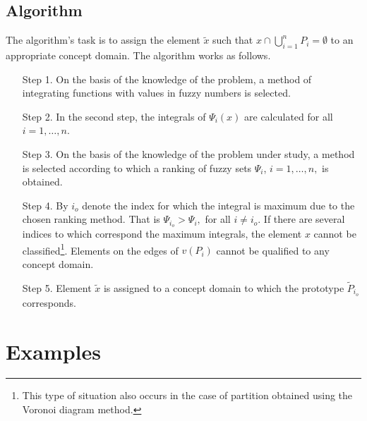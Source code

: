\documentclass[leqno,12pt]{amsart}
\theoremstyle{remark}
\theoremstyle{remark}
\theoremstyle{remark}
\theoremstyle{definition}
\numberwithin{equation}{section}
\begin{document}
\subsection{Algorithm} The algorithm's task is to assign the element $\tilde x$ such that $x\cap\bigcup_{i=1}^nP_i=\emptyset$ to an appropriate concept domain. The algorithm works as follows.
\begin{itemize}
\item[Step 1.] On the basis of the knowledge of the problem, a method of integrating functions with values in fuzzy numbers is selected.
\item[Step 2.] In the second step, the integrals of $\Psi_i(x)$ are calculated for all $i=1,\ldots,n$.
\item[Step 3.] On the basis of the knowledge of the problem under study, a method is selected according to which a ranking of fuzzy sets $\Psi_i$, $i=1,\ldots,n,$ is obtained.
\item[Step 4.] By $i_o$ denote the index for which the integral is maximum due to the chosen ranking method. That is $\Psi_{i_o}>\Psi_i,$ for all $i\not=i_o.$ If there are several indices to which correspond the maximum integrals, the element $x$ cannot be classified\footnote{This type of situation also occurs in the case of partition obtained using the Voronoi diagram method.}. Elements on the edges of $v(P_i)$ cannot be qualified to any concept domain.
\item[Step 5.] Element $\tilde x$ is assigned to a concept domain to which the prototype $\tilde P_{i_o}$ corresponds.
\end{itemize}
\section{Examples}
\end{document}

